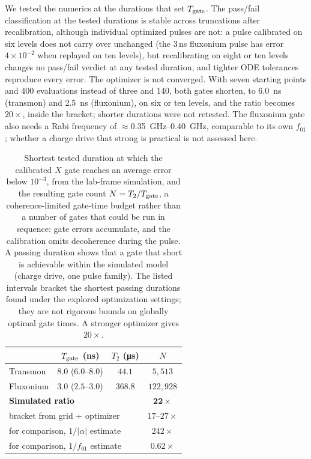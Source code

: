\documentclass{SciPost}
\begin{document}
We tested the numerics at the durations that set $T_{\rm gate}$. The pass/fail classification at the tested durations is stable across truncations after
recalibration, although individual optimized pulses are not: a pulse
calibrated on six levels does not carry over unchanged (the 3\,ns fluxonium pulse has error
$4\times10^{-2}$ when replayed on ten levels), but recalibrating on eight or ten levels changes no
pass/fail verdict at any tested duration, and tighter ODE tolerances reproduce every error. The
optimizer is not converged. With seven starting points and 400 evaluations instead of three and
140, both gates shorten, to \SI{6.0}{\nano\second} (transmon) and \SI{2.5}{\nano\second}
(fluxonium), on six or ten levels, and the ratio becomes $20\times$, inside the bracket; shorter
durations were not retested. The fluxonium gate also needs a Rabi frequency of
$\approx$\SIrange{0.35}{0.40}{\giga\hertz}, comparable to its own $f_{01}$; whether a charge
drive that strong is practical is not assessed here.

\begin{table}[tbp]
\caption{Shortest tested duration at which the calibrated $X$ gate reaches an average error below
$10^{-3}$, from the
lab-frame simulation, and the resulting gate count $N = T_2/T_{\rm gate}$, a coherence-limited
gate-time budget rather than a number of gates that could be run in sequence: gate errors
accumulate, and the calibration omits decoherence during the pulse. A passing duration shows that a gate that short is achievable within the simulated model
(charge drive, one pulse family). The listed intervals bracket the shortest passing durations found
under the explored optimization settings; they are not rigorous bounds on globally optimal gate
times. A stronger optimizer gives $20\times$.}
\label{tab:pulse}
\centering
\begin{tabular}{lccc}
\toprule
 & $T_{\rm gate}$ (ns) & $T_2$ (\si{\micro\second}) & $N$\\
\midrule
Transmon  & $8.0$ ($6.0$--$8.0$)  & $44.1$   & $5{,}513$\\
Fluxonium & $3.0$ ($2.5$--$3.0$) & $368.8$  & $122{,}928$\\
\midrule
\multicolumn{3}{l}{\textbf{Simulated ratio}} & $\mathbf{22\times}$\\
\multicolumn{3}{l}{\quad bracket from grid + optimizer} & $17$--$27\times$\\
\multicolumn{3}{l}{\quad for comparison, $1/|\alpha|$ estimate} & $242\times$\\
\multicolumn{3}{l}{\quad for comparison, $1/f_{01}$ estimate} & $0.62\times$\\
\bottomrule
\end{tabular}
\end{table}
\end{document}
